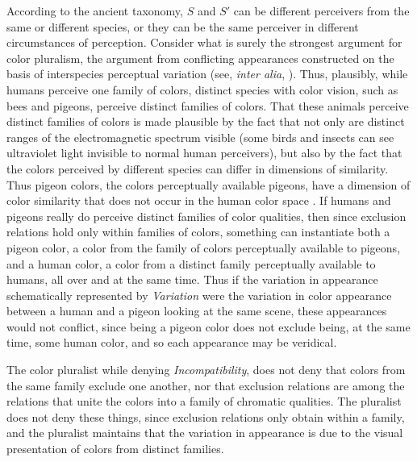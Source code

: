 \documentclass[12pt]{article}
\begin{document}
According to the ancient taxonomy, \( S \) and \( S' \) can be different perceivers from the same or different species, or they can be the same perceiver in different circumstances of perception. Consider what is surely the strongest argument for color pluralism, the argument from conflicting appearances constructed on the basis of interspecies perceptual variation (see, \emph{inter alia}, \citealt{Bradley:2001mi,Byrne:2003we,Mizrahi:2006zr,Allen:2005be,Kalderon:2006tg}). Thus, plausibly, while humans perceive one family of colors, distinct species with color vision, such as bees and pigeons, perceive distinct families of colors. That these animals perceive distinct families of colors is made plausible by the fact that not only are distinct ranges of the electromagnetic spectrum visible (some birds and insects can see ultraviolet light invisible to normal human perceivers), but also by the fact that the colors perceived by different species can differ in dimensions of similarity. Thus pigeon colors, the colors perceptually available pigeons, have a dimension of color similarity that does not occur in the human color space \citep{Bradley:2001mi,Allen:2005be}. If humans and pigeons really do perceive distinct families of color qualities, then since exclusion relations hold only within families of colors, something can instantiate both a pigeon color, a color from the family of colors perceptually available to pigeons, and a human color, a color from a distinct family perceptually available to humans, all over and at the same time. Thus if the variation in appearance schematically represented by \emph{Variation} were the variation in color appearance between a human and a pigeon looking at the same scene, these appearances would not conflict, since being a pigeon color does not exclude being, at the same time, some human color, and so each appearance may be veridical.

The color pluralist while denying \emph{Incompatibility}, does not deny that colors from the same family exclude one another, nor that exclusion relations are among the relations that unite the colors into a family of chromatic qualities. The pluralist does not deny these things, since exclusion relations only obtain within a family, and the pluralist maintains that the variation in appearance is due to the visual presentation of colors from distinct families.
\end{document}
